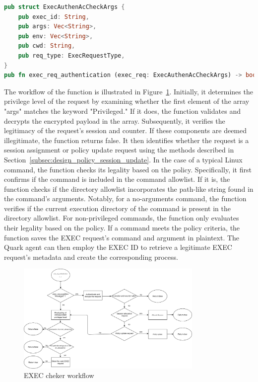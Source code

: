 \begin{lstlisting}[language=rust, caption= API of EXEC checker, label={lst:exec_Cheker}]
pub struct ExecAuthenAcCheckArgs {
    pub exec_id: String,
    pub args: Vec<String>,
    pub env: Vec<String>,
    pub cwd: String,
    pub req_type: ExecRequestType,
}
pub fn exec_req_authentication (exec_req: ExecAuthenAcCheckArgs) -> bool
\end{lstlisting}

The workflow of the function is illustrated in Figure~\ref{fig:exec_req_authentication_flow_chart}. Initially, it determines the privilege level of the request by examining whether the first element of the array "args" matches the keyword "Privileged." If it does, the function validates and decrypts the 
encrypted payload in the array. Subsequently, it verifies the legitimacy of the request's session and counter. If these components are deemed illegitimate, the function returns false. It then identifies whether the request is a session assignment or policy update request using the methods described 
in Section~\ref{subsec:design_policy_session_update}. In the case of a typical Linux command, the function checks its legality based on the policy. Specifically, it first confirms if the command is included in the command allowlist. If it is, the function checks if the directory allowlist incorporates the path-like string found in the 
command's arguments. Notably, for a no-arguments command, the function verifies if the current execution directory of the command is present in the directory allowlist. For non-privileged commands, the function only evaluates their legality based on the policy. If a command meets the policy criteria, 
the function saves the EXEC request's command and argument in plaintext. The Quark agent can then employ the EXEC ID to retrieve a legitimate EXEC request's metadata and create the corresponding process.

\begin{figure}[!htb]
    \centering
    \includegraphics[width=0.8\textwidth]{images/exec_req_authentication_flow_chart.png}
    \caption[EXEC cheker workflow]{EXEC cheker workflow}
    \label{fig:exec_req_authentication_flow_chart}
\end{figure}

